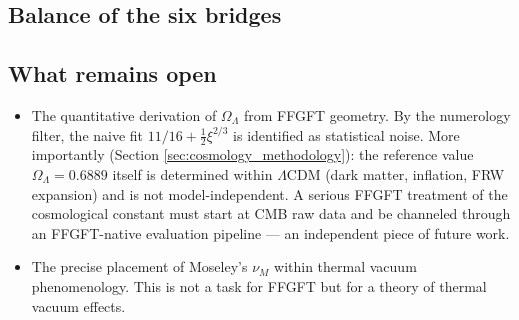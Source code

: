 \subsection{Balance of the six bridges}

\begin{table}[h]
\centering
\caption{Bridge tests}
\end{table}

\subsection{What remains open}

\begin{itemize}
\item The quantitative derivation of \(\Omega_\Lambda\) from FFGFT geometry. By the numerology filter, the naive fit \(11/16 + \tfrac{1}{2}\xi^{2/3}\) is identified as statistical noise. More importantly (Section \ref{sec:cosmology_methodology}): the reference value \(\Omega_\Lambda = 0.6889\) itself is determined within \(\Lambda\)CDM (dark matter, inflation, FRW expansion) and is not model-independent. A serious FFGFT treatment of the cosmological constant must start at CMB raw data and be channeled through an FFGFT-native evaluation pipeline --- an independent piece of future work.
\item The precise placement of Moseley's \(\nu_M\) within thermal vacuum phenomenology. This is not a task for FFGFT but for a theory of thermal vacuum effects.
\end{itemize}

